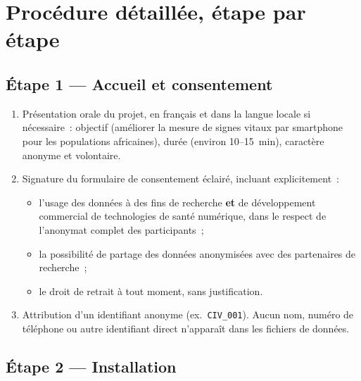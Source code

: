 \documentclass[11pt,a4paper]{article}
\begin{document}
\newpage
\section{Proc\'edure d\'etaill\'ee, \'etape par \'etape}

\subsection{\'Etape 1 --- Accueil et consentement}

\begin{enumerate}
\item Pr\'esentation orale du projet, en fran\c{c}ais et dans la langue
locale si n\'ecessaire~: objectif (am\'eliorer la mesure de signes vitaux par
smartphone pour les populations africaines), dur\'ee (environ 10--15~min),
caract\`ere anonyme et volontaire.
\item Signature du formulaire de consentement \'eclair\'e, incluant
explicitement~:
  \begin{itemize}
  \item l'usage des donn\'ees \`a des fins de recherche \textbf{et} de
  d\'eveloppement commercial de technologies de sant\'e num\'erique, dans le
  respect de l'anonymat complet des participants~;
  \item la possibilit\'e de partage des donn\'ees anonymis\'ees avec des
  partenaires de recherche~;
  \item le droit de retrait \`a tout moment, sans justification.
  \end{itemize}
\item Attribution d'un identifiant anonyme (ex.\ \texttt{CIV\_001}). Aucun
nom, num\'ero de t\'el\'ephone ou autre identifiant direct n'appara\^it dans
les fichiers de donn\'ees.
\end{enumerate}

\subsection{\'Etape 2 --- Installation}
\end{document}
